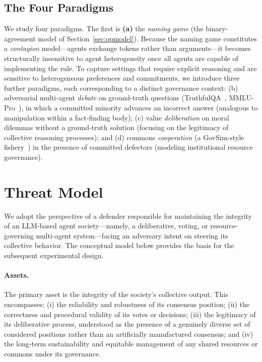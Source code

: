 \documentclass[manuscript,screen,review]{acmart}
\begin{document}
\subsection{The Four Paradigms}
We study four paradigms. The first is \textbf{(a)} the \emph{naming game} (the binary-agreement model of Section~\ref{sec:opmodel}). Because the naming game constitutes a \emph{contagion} model—agents exchange tokens rather than arguments—it becomes structurally insensitive to agent heterogeneity once all agents are capable of implementing the rule. To capture settings that require explicit reasoning and are sensitive to heterogeneous preferences and commitments, we introduce three further paradigms, each corresponding to a distinct governance context: (b) adversarial multi-agent \emph{debate} on ground-truth questions (TruthfulQA~\cite{lin2022truthfulqa}, MMLU-Pro~\cite{wang2024mmlupro}), in which a committed minority advances an incorrect answer (analogous to manipulation within a fact-finding body); (c) value \emph{deliberation} on moral dilemmas without a ground-truth solution (focusing on the legitimacy of collective reasoning processes); and (d) commons \emph{cooperation} (a GovSim-style fishery~\cite{piatti2024}) in the presence of committed defectors (modeling institutional resource governance).

\section{Threat Model}
\label{sec:threat}
We adopt the perspective of a defender responsible for maintaining the integrity of an LLM-based agent society—namely, a deliberative, voting, or resource-governing multi-agent system—facing an adversary intent on steering its collective behavior. The conceptual model below provides the basis for the subsequent experimental design.

\paragraph{Assets.} The primary asset is the integrity of the society’s collective output. This encompasses: (i) the reliability and robustness of its consensus position; (ii) the correctness and procedural validity of its votes or decisions; (iii) the legitimacy of its deliberative process, understood as the presence of a genuinely diverse set of considered positions rather than an artificially manufactured consensus; and (iv) the long-term sustainability and equitable management of any shared resources or commons under its governance.
\end{document}
